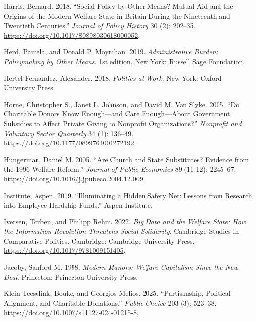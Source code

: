 \documentclass[
  11pt,
  oneside]{article}
\newlength{\cslhangindent}
\newenvironment{CSLReferences}[2] %
 {\begin{list}{}{%
  \setlength{\itemindent}{0pt}
  \setlength{\leftmargin}{0pt}
  \setlength{\parsep}{0pt}
  \ifodd #1
   \setlength{\leftmargin}{\cslhangindent}
   \setlength{\itemindent}{-1\cslhangindent}
  \fi
  \setlength{\itemsep}{#2\baselineskip}}}
 {\end{list}}
\begin{document}
\begin{CSLReferences}{1}{0}
Harris, Bernard. 2018. {``Social {Policy} by {Other Means}? {Mutual Aid} and the {Origins} of the {Modern Welfare State} in {Britain During} the {Nineteenth} and {Twentieth Centuries}.''} \emph{Journal of Policy History} 30 (2): 202--35. \url{https://doi.org/10.1017/S0898030618000052}.

Herd, Pamela, and Donald P. Moynihan. 2019. \emph{Administrative {Burden}: {Policymaking} by {Other Means}}. 1st edition. New York: Russell Sage Foundation.

Hertel-Fernandez, Alexander. 2018. \emph{Politics at {Work}}. New York: Oxford University Press.

Horne, Christopher S., Janet L. Johnson, and David M. Van Slyke. 2005. {``Do {Charitable Donors Know Enough}---and {Care Enough}---{About Government Subsidies} to {Affect Private Giving} to {Nonprofit Organizations}?''} \emph{Nonprofit and Voluntary Sector Quarterly} 34 (1): 136--49. \url{https://doi.org/10.1177/0899764004272192}.

Hungerman, Daniel M. 2005. {``Are Church and State Substitutes? {Evidence} from the 1996 Welfare Reform.''} \emph{Journal of Public Economics} 89 (11-12): 2245--67. \url{https://doi.org/10.1016/j.jpubeco.2004.12.009}.

Institute, Aspen. 2019. {``Illuminating a {Hidden Safety Net}: {Lessons} from {Research} into {Employee Hardship Funds}.''} Aspen Institute.

Iversen, Torben, and Philipp Rehm. 2022. \emph{Big {Data} and the {Welfare State}: {How} the {Information Revolution Threatens Social Solidarity}}. Cambridge {Studies} in {Comparative Politics}. Cambridge: Cambridge University Press. \url{https://doi.org/10.1017/9781009151405}.

Jacoby, Sanford M. 1998. \emph{Modern {Manors}: {Welfare Capitalism} Since the {New Deal}}. Princeton: Princeton University Press.

Klein Teeselink, Bouke, and Georgios Melios. 2025. {``Partisanship, Political Alignment, and Charitable Donations.''} \emph{Public Choice} 203 (3): 523--38. \url{https://doi.org/10.1007/s11127-024-01215-8}.


\end{CSLReferences}
\end{document}
